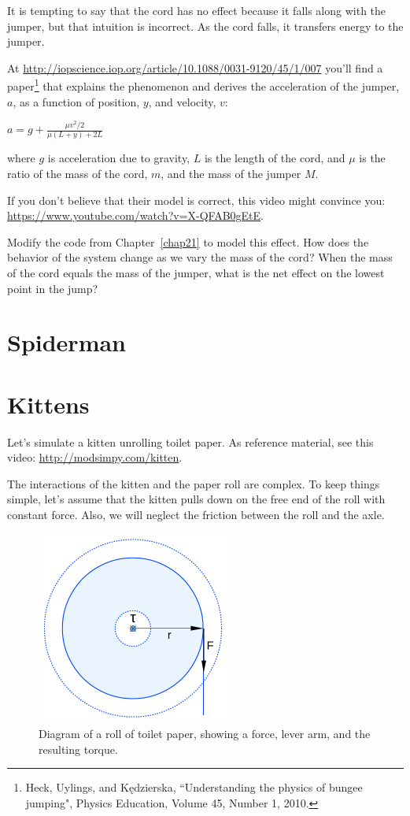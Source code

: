 \documentclass[12pt]{book}
\theoremstyle{exercise}
\begin{document}
It is tempting to say that the cord has no effect because it falls along with the jumper, but that intuition is incorrect.  As the cord falls, it transfers energy to the jumper.

At \url{http://iopscience.iop.org/article/10.1088/0031-9120/45/1/007} you'll find a paper\footnote{Heck, Uylings, and Kędzierska, ``Understanding the physics of bungee jumping", Physics Education, Volume 45, Number 1, 2010.} that explains the phenomenon and derives the acceleration of the jumper, $a$, as a function of position, $y$, and velocity, $v$:

$a = g + \frac{\mu v^2/2}{\mu(L+y) + 2L}$ 

where $g$ is acceleration due to gravity, $L$ is the length of the cord, and $\mu$ is the ratio of the mass of the cord, $m$, and the mass of the jumper $M$.

If you don't believe that their model is correct, this video might convince you: \url{https://www.youtube.com/watch?v=X-QFAB0gEtE}.

Modify the code from Chapter~\ref{chap21} to model this effect.  How does the behavior of the system change as we vary the mass of the cord?  When the mass of the cord equals the mass of the jumper, what is the net effect on the lowest point in the jump?


\section{Spiderman}




\section{Kittens}

Let's simulate a kitten unrolling toilet paper.  As reference material, see this video: \url{http://modsimpy.com/kitten}.


The interactions of the kitten and the paper roll are complex.  To keep things simple, let's assume that the kitten pulls down on the free end of the roll with constant force.  Also, we will neglect the friction between the roll and the axle.  

\begin{figure}
\centerline{\includegraphics[height=2.5in]{figs/paper_roll2.pdf}}
\caption{Diagram of a roll of toilet paper, showing a force, lever arm, and the resulting torque.}
\label{paper_roll2}
\end{figure}
\end{document}
